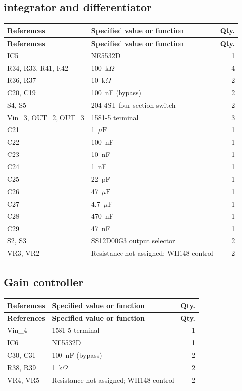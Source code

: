 \documentclass[11pt,a4paper]{article}
\renewcommand{\arraystretch}{1.15}
\newcommand{\kohm}{\ensuremath{\mathrm{k}\Omega}}
\newcommand{\uF}{\ensuremath{\mu\mathrm{F}}}
\begin{document}
\subsection{integrator and differentiator}
\begingroup
\small
\renewcommand{\arraystretch}{1.08}
\begin{longtable}{P{0.30\textwidth}P{0.52\textwidth}r}
\toprule\textbf{References} & \textbf{Specified value or function} & \textbf{Qty.}\\\midrule\endfirsthead
\toprule\textbf{References} & \textbf{Specified value or function} & \textbf{Qty.}\\\midrule\endhead
IC5 & NE5532D & 1\\
R34, R33, R41, R42 & 100~\kohm & 4\\
R36, R37 & 10~\kohm & 2\\
C20, C19 & 100~nF (bypass) & 2\\
S4, S5 & 204-4ST four-section switch & 2\\
Vin\_3, OUT\_2, OUT\_3 & 1581-5 terminal & 3\\
C21 & 1~\uF & 1\\
C22 & 100~nF & 1\\
C23 & 10~nF & 1\\
C24 & 1~nF & 1\\
C25 & 22~pF & 1\\
C26 & 47~\uF & 1\\
C27 & 4.7~\uF & 1\\
C28 & 470~nF & 1\\
C29 & 47~nF & 1\\
S2, S3 & SS12D00G3 output selector & 2\\
VR3, VR2 & Resistance not assigned; WH148 control & 2\\
\bottomrule
\end{longtable}
\endgroup
{}
\subsection{Gain controller}
\begingroup
\small
\renewcommand{\arraystretch}{1.08}
\begin{longtable}{P{0.30\textwidth}P{0.52\textwidth}r}
\toprule\textbf{References} & \textbf{Specified value or function} & \textbf{Qty.}\\\midrule\endfirsthead
\toprule\textbf{References} & \textbf{Specified value or function} & \textbf{Qty.}\\\midrule\endhead
Vin\_4 & 1581-5 terminal & 1\\
IC6 & NE5532D & 1\\
C30, C31 & 100~nF (bypass) & 2\\
R38, R39 & 1~\kohm & 2\\
VR4, VR5 & Resistance not assigned; WH148 control & 2\\
\bottomrule
\end{longtable}
\endgroup
\end{document}
